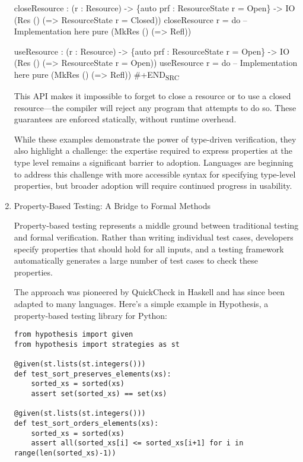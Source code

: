 \documentclass[11pt]{article}
\begin{document}
\begin{enumerate}
closeResource : (r : Resource) -> 
                \{auto prf : ResourceState r = Open\} -> 
                IO (Res () (\hspace*{0.5em}=> ResourceState r = Closed))
closeResource r = do
  -- Implementation here
  pure (MkRes () (\hspace*{0.5em}=> Refl))

useResource : (r : Resource) -> 
              \{auto prf : ResourceState r = Open\} -> 
              IO (Res () (\hspace*{0.5em}=> ResourceState r = Open))
useResource r = do
  -- Implementation here
  pure (MkRes () (\hspace*{0.5em}=> Refl))
\#+END\textsubscript{SRC}

This API makes it impossible to forget to close a resource or to use a closed resource—the compiler will reject any program that attempts to do so. These guarantees are enforced statically, without runtime overhead.

While these examples demonstrate the power of type-driven verification, they also highlight a challenge: the expertise required to express properties at the type level remains a significant barrier to adoption. Languages are beginning to address this challenge with more accessible syntax for specifying type-level properties, but broader adoption will require continued progress in usability.
\item Property-Based Testing: A Bridge to Formal Methods
\label{sec:orgace31e6}

Property-based testing represents a middle ground between traditional testing and formal verification. Rather than writing individual test cases, developers specify properties that should hold for all inputs, and a testing framework automatically generates a large number of test cases to check these properties.

The approach was pioneered by QuickCheck in Haskell and has since been adapted to many languages. Here's a simple example in Hypothesis, a property-based testing library for Python:

\begin{verbatim}
from hypothesis import given
from hypothesis import strategies as st

@given(st.lists(st.integers()))
def test_sort_preserves_elements(xs):
    sorted_xs = sorted(xs)
    assert set(sorted_xs) == set(xs)

@given(st.lists(st.integers()))
def test_sort_orders_elements(xs):
    sorted_xs = sorted(xs)
    assert all(sorted_xs[i] <= sorted_xs[i+1] for i in range(len(sorted_xs)-1))
\end{verbatim}


\end{enumerate}
\end{document}
